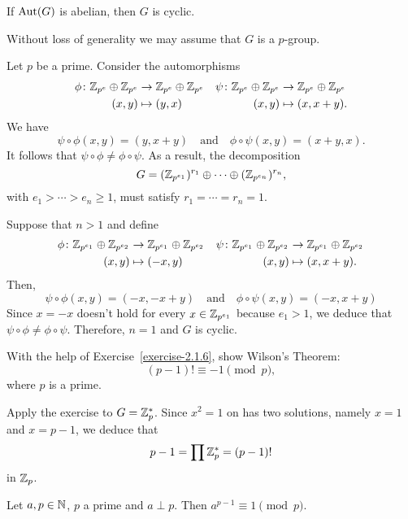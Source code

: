 \begin{exr}
    If\/ ${\rm Aut}(G)$ is abelian, then\/ $G$ is cyclic.
\end{exr}

\begin{solution} Without loss of generality we may assume that $G$ is a $p$-group.

Let $p$ be a prime. Consider the automorphisms
\begin{align*}
    \phi\colon\mathbb{Z}_{p^e}\oplus\mathbb{Z}_{p^e}
        &\to\mathbb{Z}_{p^e}\oplus\mathbb{Z}_{p^e}
    &\psi\colon\mathbb{Z}_{p^e}\oplus\mathbb{Z}_{p^e}
        &\to\mathbb{Z}_{p^e}\oplus\mathbb{Z}_{p^e}\\
    (x,y)&\mapsto(y,x)&(x,y)&\mapsto(x,x+y).
\end{align*}
We have
$$
    \psi\circ\phi(x,y)=(y,x+y)\quad\text{and}\quad
    \phi\circ\psi(x,y)=(x+y,x).
$$
It follows that $\psi\circ\phi\ne\phi\circ\psi$. As a result, the decomposition
$$
    G=(\mathbb{Z}_{p^{e_1}})^{r_1}\oplus\cdots\oplus(\mathbb{Z}_{p^{e_n}})^{r_n},
$$
with $e_1>\cdots>e_n\ge1$, must satisfy $r_1=\cdots=r_n=1$.

Suppose that $n>1$ and define
\begin{align*}
    \phi\colon\mathbb{Z}_{p^{e_1}}\oplus\mathbb{Z}_{p^{e_2}}
        &\to\mathbb{Z}_{p^{e_1}}\oplus\mathbb{Z}_{p^{e_2}}
    &\psi\colon\mathbb{Z}_{p^{e_1}}\oplus\mathbb{Z}_{p^{e_2}}
        &\to\mathbb{Z}_{p^{e_1}}\oplus\mathbb{Z}_{p^{e_2}}\\
        (x,y)&\mapsto(-x,y)&(x,y)&\mapsto(x,x+y).
\end{align*}
Then,
$$
    \psi\circ\phi(x,y)=(-x,-x+y)\quad\text{and}\quad
    \phi\circ\psi(x,y)=(-x,x+y)
$$
Since $x=-x$ doesn't hold for every $x\in\mathbb{Z}_{p^{e_1}}$ because $e_1>1$, we deduce that $\psi\circ\phi\ne\phi\circ\psi$. Therefore, $n=1$ and $G$ is cyclic.  \end{solution}

\begin{exr}
    With the help of\/ \textrm{\rm Exercise~\ref{exercise-2.1.6}}, show Wilson's Theorem:
    $$
        (p - 1)! \equiv -1 \pmod p,
    $$
    where\/ $p$ is a prime.
\end{exr}

\begin{solution} Apply the exercise to $G=\mathbb{Z}_p^*$. Since $x^2=1$ on has two solutions, namely $x=1$ and $x=p-1$, we deduce that
$$
    p-1=\prod\mathbb{Z}_p^*=(p-1)!
$$
in $\mathbb{Z}_p$.  \end{solution}

\begin{exr}
    Let\/ $a, p \in \mathbb{N}$, $p$ a prime and\/ $a\perp p$. Then\/ $a^{p-1} \equiv 1 \pmod{p}$.
\end{exr}

